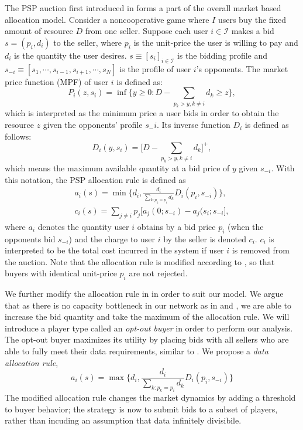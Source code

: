 \documentclass[12pt]{article}
\theoremstyle{definition}
\begin{document}
\begin{multicols}{2}
The PSP auction first introduced in \cite{lazar} forms a part of the
overall market based allocation model. Consider a noncooperative game
where $I$ users buy the fixed amount of resource $D$ from one seller. Suppose
each user $i \in \mathcal{I}$ makes a bid $s = (p_i , d_i )$ to the seller,
where $p_i$ is the unit-price the user is willing to pay and $d_i$ is the
quantity the user desires. $s \equiv [s_i]_{i\in\mathcal{I}}$ is the bidding
profile and $s_{−i} \equiv [s_1 , \cdots , s_{i−1} , s_{i+1} , \cdots , s_N]$ is
the profile of user $i$’s opponents. The market price function (MPF) of user $i$ is defined as:
\begin{equation}
    P_i(z, s_i) = \inf\bigg\lbrace y\ge 0 : D - \displaystyle\sum_{p_k>y, k\ne i} d_k
\ge z \bigg\rbrace,
\end{equation}
which is interpreted as the minimum price a user bids in order to obtain the
resource $z$ given the opponents’ profile $s_−i$. Its inverse function $D_i$ is defined as follows:
\begin{equation}
    D_i(y, s_i) = \bigg\lbrack D - \displaystyle\sum_{p_k > y, k\ne i}
d_k\bigg\rbrack^+,
\end{equation}
which means the maximum available quantity at a bid price of $y$ given
$s_{−i}$. With this notation, the PSP allocation rule \cite{tuffin} is defined as
\begin{align}
    a_i(s) = \min\big\lbrace d_i, \frac{d_i}{\sum_{k:p_k=p_i}d_k} D_i(p_i,
s_{-i})\big\rbrace, \\
    c_i(s) = \displaystyle\sum_{j\ne i} p_j \big[a_j(0; s_{-i}) -
a_j(s_i;s_{-i}\big],
\end{align}
where $a_i$ denotes the quantity user $i$ obtains by a bid price $p_i$ (when the
opponents bid $s_{−i}$) and the charge to user $i$ by the seller is denoted
$c_i$. $c_i$ is interpreted to be the total cost incurred in the system if
user $i$ is removed from the auction. Note that the allocation rule is modified
according to \cite{tuffin}, so that buyers with identical unit-price
$p_i$ are not rejected.

We further modify the allocation rule in \cite{tuffin} in order to suit our
model. We argue that as there is no capacity bottleneck in our network as in
\cite{lazar} and \cite{semret}, we are able to increase the bid quantity and
take the maximum of the allocation rule. 
We will introduce a player type called an \emph{opt-out buyer} in order to perform our analysis. The
opt-out buyer maximizes its utility by placing bids with all sellers who are
able to fully meet their data requirements, similar to \cite{zheng}. 
We propose a \emph{data allocation rule},
{
\label{allocation}
\begin{equation}
    a_i(s) = \max\big\lbrace d_i, \frac{d_i}{\sum_{k:p_k=p_i}d_k}
D_i(p_i,s_{-i})\big\rbrace
\end{equation}
}
The modified allocation rule changes the market dynamics by adding a threshold
to buyer behavior; the strategy is now to submit bids to a subset of
players, rather than incuding an assumption that data infinitely divisibile.


\end{multicols}
\end{document}
